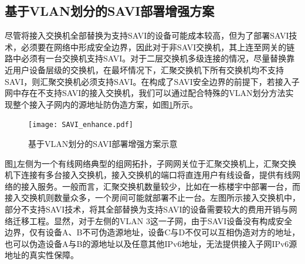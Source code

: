     \subsection{基于VLAN划分的SAVI部署增强方案}
    \label{IPv6_Security:access:enhance}
    尽管将接入交换机全部替换为支持SAVI的设备可能成本较高，但为了部署SAVI技术，必须要在网络中形成安全边界，因此对于非SAVI交换机，其上连至网关的链路中必须有一台交换机支持SAVI。对于二层交换机多级连接的情况，尽量替换靠近用户设备层级的交换机，在最坏情况下，汇聚交换机下所有交换机均不支持SAVI，则汇聚交换机必须支持SAVI。在构成了SAVI安全边界的前提下，若接入子网中存在不支持SAVI的接入交换机，我们可以通过配合特殊的VLAN划分方法实现整个接入子网内的源地址防伪造方案，如图\ref{fig:SAVI_enhance}所示。

    \begin{figure}[ht]
      \centering
      \texttt{[image: SAVI\_enhance.pdf]}
      \caption{基于VLAN划分的SAVI部署增强方案示意}
      \label{fig:SAVI_enhance}
    \end{figure}

    图\ref{fig:SAVI_enhance}左侧为一个有线网络典型的组网拓扑，子网网关位于汇聚交换机上，汇聚交换机下连接有多台接入交换机，接入交换机的端口将直连用户有线设备，提供有线网络的接入服务。一般而言，汇聚交换机数量较少，比如在一栋楼宇中部署一台，而接入交换机则数量众多，一个房间可能就部署不止一台。左图所示接入交换机中，部分不支持SAVI技术，将其全部替换为支持SAVI的设备需要较大的费用开销与网络迁移工程。显然，对于左侧的VLAN 3这一子网，由于SAVI设备没有构成安全边界，仅有设备A、B不可伪造源地址，设备C与D不仅可以互相伪造对方的地址，也可以伪造设备A与B的源地址以及任意其他IPv6地址，无法提供接入子网IPv6源地址的真实性保障。

